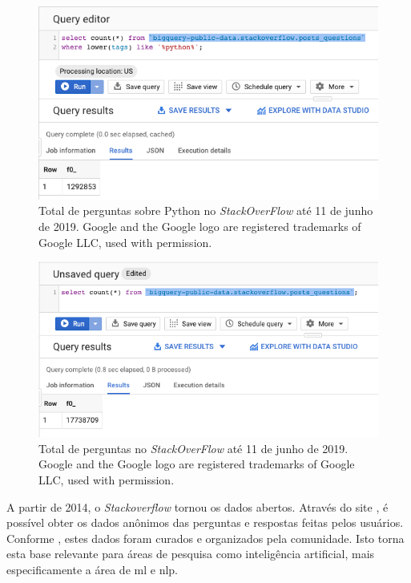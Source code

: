 \begin{figure}[h]
\includegraphics[width=12cm]{src/figuras/cap-introducao/number-python-questions-sof.png}
\caption{Total de perguntas sobre Python no \textit{StackOverFlow} até 11 de junho de 2019. Google and the Google logo are registered trademarks of Google LLC, used with permission.}
\label{fig:bigquery-total-questions-python-stackoverflow}
\end{figure}

\begin{figure}[h]
\includegraphics[width=12cm]{src/figuras/cap-introducao/number-questions-sof.png}
\caption{Total de perguntas no \textit{StackOverFlow} até 11 de junho de 2019. Google and the Google logo are registered trademarks of Google LLC, used with permission.}
\label{fig:bigquery-total-questions-stackoverflow}
\end{figure}

A partir de 2014, o \textit{Stackoverflow} tornou os dados abertos. Através do site \cite{sof-2019}, é possível obter os dados anônimos das perguntas e respostas feitas pelos usuários. Conforme \cite{Wang-quora:2013}, estes dados foram curados e organizados pela comunidade. Isto torna esta base relevante para áreas de pesquisa como inteligência artificial, mais especificamente a área de \gls{ml} e \acrfull{nlp}. 

